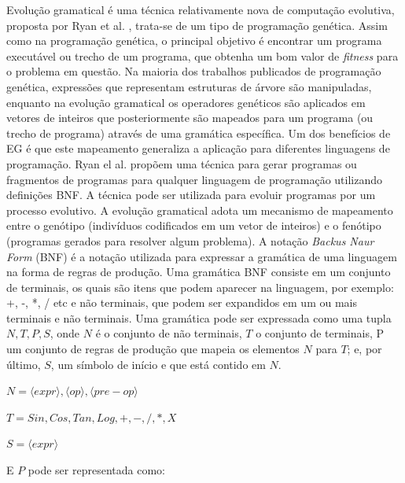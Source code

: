 Evolução gramatical é uma técnica relativamente nova de computação evolutiva, proposta por Ryan et al. \cite{ryan1998grammatical}, trata-se de um tipo de programação genética. Assim como na programação genética, o principal objetivo é encontrar um programa executável ou trecho de um programa, que obtenha um bom valor de \textit{fitness} para o problema em questão. Na maioria dos trabalhos publicados de programação genética, expressões que representam estruturas de árvore são manipuladas, enquanto na evolução gramatical os operadores genéticos são aplicados em vetores de inteiros que posteriormente são mapeados para um programa (ou trecho de programa) através de uma gramática específica. Um dos benefícios de EG é que este mapeamento generaliza a aplicação para diferentes linguagens de programação.
Ryan el al. \cite{ryan1998grammatical} propõem uma técnica para gerar programas ou fragmentos de programas para qualquer linguagem de programação utilizando definições BNF. A técnica pode ser utilizada para evoluir programas por um processo evolutivo. A evolução gramatical adota um mecanismo de mapeamento entre o genótipo (indivíduos codificados em um vetor de inteiros) e o fenótipo (programas gerados para resolver algum problema). 
A notação \textit{Backus Naur Form} (BNF) é a notação utilizada para expressar a gramática de uma linguagem na forma de regras de produção. Uma gramática BNF consiste em um conjunto de terminais, os quais são itens que podem aparecer na linguagem, por exemplo: +, -, *, / etc e não terminais, que podem ser expandidos em um ou mais terminais e não terminais. Uma gramática pode ser expressada como uma tupla ${N,T,P,S}$, onde $N$ é o conjunto de não terminais, $T$ o conjunto de terminais, P um conjunto de regras de produção que mapeia os elementos $N$ para $T$; e, por último, $S$, um símbolo de início e que está contido em $N$.

\begin{center}
	
	$ N = {\langle expr \rangle, \langle op \rangle, \langle pre-op \rangle}$
	
	$ T = {Sin,Cos,Tan,Log,+,-,/,*,X} $
	
	$ S = \langle expr \rangle $
	
\end{center}

\noindent
E $P$ pode ser representada como:


